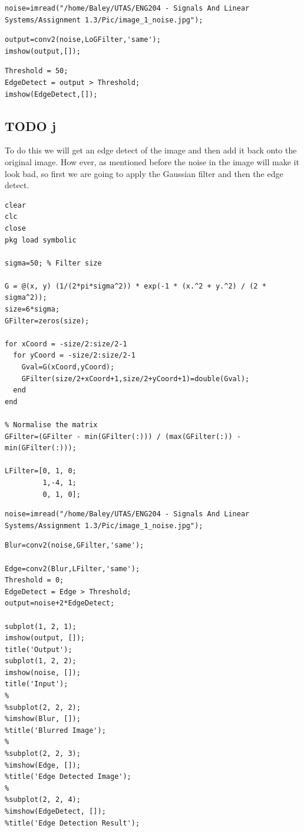 \documentclass[11pt]{article}
\begin{document}
\begin{verbatim}
noise=imread("/home/Baley/UTAS/ENG204 - Signals And Linear Systems/Assignment 1.3/Pic/image_1_noise.jpg");
\end{verbatim}

\begin{verbatim}
output=conv2(noise,LoGFilter,'same');
imshow(output,[]);
\end{verbatim}

\begin{verbatim}
Threshold = 50;
EdgeDetect = output > Threshold;
imshow(EdgeDetect,[]);
\end{verbatim}
\subsection{{\bfseries\sffamily TODO} j}
\label{sec:org3e55895}
To do this we will get an edge detect of the image and then add it back onto the original image. How ever, as mentioned before the noise in the image will make it look bad, so first we are going to apply the Gaussian filter and then the edge detect.
\begin{verbatim}
clear
clc
close
pkg load symbolic

sigma=50; % Filter size

G = @(x, y) (1/(2*pi*sigma^2)) * exp(-1 * (x.^2 + y.^2) / (2 * sigma^2));
size=6*sigma;
GFilter=zeros(size);

for xCoord = -size/2:size/2-1
  for yCoord = -size/2:size/2-1
    Gval=G(xCoord,yCoord);
    GFilter(size/2+xCoord+1,size/2+yCoord+1)=double(Gval);
  end
end

% Normalise the matrix
GFilter=(GFilter - min(GFilter(:))) / (max(GFilter(:)) - min(GFilter(:)));

LFilter=[0, 1, 0;
         1,-4, 1;
         0, 1, 0];

\end{verbatim}



\begin{verbatim}
noise=imread("/home/Baley/UTAS/ENG204 - Signals And Linear Systems/Assignment 1.3/Pic/image_1_noise.jpg");
\end{verbatim}

\begin{verbatim}
Blur=conv2(noise,GFilter,'same');

Edge=conv2(Blur,LFilter,'same');
Threshold = 0;
EdgeDetect = Edge > Threshold;
output=noise+2*EdgeDetect;

subplot(1, 2, 1);
imshow(output, []);
title('Output');
subplot(1, 2, 2);
imshow(noise, []);
title('Input');
%
%subplot(2, 2, 2);
%imshow(Blur, []);
%title('Blurred Image');
%
%subplot(2, 2, 3);
%imshow(Edge, []);
%title('Edge Detected Image');
%
%subplot(2, 2, 4);
%imshow(EdgeDetect, []);
%title('Edge Detection Result');
\end{verbatim}
\end{document}
